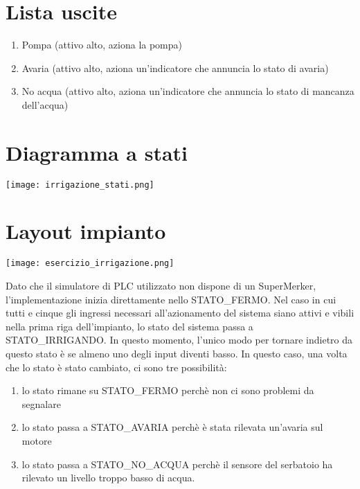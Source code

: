 \documentclass{article}
\begin{document}
    \section{Lista uscite}

    \begin{enumerate}
        \item Pompa (attivo alto, aziona la pompa)
        \item Avaria (attivo alto, aziona un'indicatore che annuncia lo stato di avaria)
        \item No acqua (attivo alto, aziona un'indicatore che annuncia lo stato di mancanza dell'acqua)
    \end{enumerate}

    \section{Diagramma a stati}

    \begin{center}
        \texttt{[image: irrigazione\_stati.png]}
    \end{center}

    \section{Layout impianto}

    \begin{center}
        \texttt{[image: esercizio\_irrigazione.png]}
    \end{center}

    Dato che il simulatore di PLC utilizzato non dispone di un SuperMerker, l'implementazione inizia direttamente nello STATO\_FERMO. Nel caso in cui tutti e cinque gli ingressi necessari all'azionamento del sistema siano attivi e vibili nella prima riga dell'impianto, lo stato del sistema passa a STATO\_IRRIGANDO. In questo momento, l'unico modo per tornare indietro da questo stato è se almeno uno degli input diventi basso. In questo caso, una volta che lo stato è stato cambiato, ci sono tre possibilità:

    \begin{enumerate}
        \item lo stato rimane su STATO\_FERMO perchè non ci sono problemi da segnalare
        \item lo stato passa a STATO\_AVARIA perchè è stata rilevata un'avaria sul motore
        \item lo stato passa a STATO\_NO\_ACQUA perchè il sensore del serbatoio ha rilevato un livello troppo basso di acqua.
    \end{enumerate}
\end{document}
